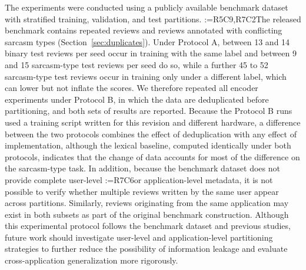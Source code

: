 \documentclass[a4paper,fleqn]{cas-sc}
\makeatletter
\newif\iftracked
\newcommand{\rv@setcolour}[1]{%
  \IfStrEq{#1}{R7C7}{\color{rvEdit}}{%
    \IfSubStr{#1}{R5}{\IfSubStr{#1}{R7}{\color{rvBoth}}{\color{rvFive}}}{\color{rvSeven}}}}
\newcommand{\rv@tag}[1]{\textsuperscript{\sffamily\bfseries\scriptsize[\StrSubstitute{#1}{,}{, }]}\,}
\newcommand{\rv@recordone}[1]{%
  \edef\rv@i{#1}%
  \ifcsdef{rv@n@\rv@i}{}{\csgdef{rv@n@\rv@i}{0}}%
  \csxdef{rv@n@\rv@i}{\the\numexpr\csuse{rv@n@\rv@i}+1\relax}%
  \begingroup\edef\@currentlabel{\rv@i}\label{rv:\rv@i:\csuse{rv@n@\rv@i}}\endgroup}
\newcommand{\rv@record}[1]{\@for\rv@id:=#1\do{\expandafter\rv@recordone\expandafter{\rv@id}}}
\DeclareRobustCommand{\rc}[2]{\rv@record{#1}\iftracked{\rv@setcolour{#1}\rv@tag{#1}#2}\else#2\fi}
\DeclareRobustCommand{\rcrep}[3]{\rv@record{#1}\iftracked{\rv@setcolour{#1}\rv@tag{#1}\rv@strike{#2} #3}\else#3\fi}
\makeatother
\begin{document}
The experiments were conducted using a publicly available benchmark dataset with stratified training, validation, and test partitions. \rcrep{R5C9,R7C2}{A duplicate-text audit of the partitions identified a small number of reviews whose exact text appears in more than one partition, amounting to between five and eleven training and test pairs per seed for the binary task and between forty-eight and fifty-four per seed for the sarcasm-type task. These overlaps originate in the benchmark corpus itself, which contains 82 duplicated rows in the binary dataset and 487 duplicated rows in the sarcasm-type dataset. For the sarcasm-type task, the affected instances correspond to approximately two percent of a training partition of 2,422 reviews, and the resulting optimistic bias is therefore expected to be small but is not zero. We report these counts explicitly rather than omitting them, and deduplication prior to partitioning is identified as a necessary refinement of the protocol.}{The released benchmark contains repeated reviews and reviews annotated with conflicting sarcasm types (Section~\ref{sec:duplicates}). Under Protocol A, between 13 and 14 binary test reviews per seed occur in training with the same label and between 9 and 15 sarcasm-type test reviews per seed do so, while a further 45 to 52 sarcasm-type test reviews occur in training only under a different label, which can lower but not inflate the scores. We therefore repeated all encoder experiments under Protocol B, in which the data are deduplicated before partitioning, and both sets of results are reported. Because the Protocol B runs used a training script written for this revision and different hardware, a difference between the two protocols combines the effect of deduplication with any effect of implementation, although the lexical baseline, computed identically under both protocols, indicates that the change of data accounts for most of the difference on the sarcasm-type task.} In addition, because the benchmark dataset does not provide complete user-level \rc{R7C6}{or application-level} metadata, it is not possible to verify whether multiple reviews written by the same user appear across partitions. Similarly, reviews originating from the same application may exist in both subsets as part of the original benchmark construction. Although this experimental protocol follows the benchmark dataset and previous studies, future work should investigate user-level and application-level partitioning strategies to further reduce the possibility of information leakage and evaluate cross-application generalization more rigorously.
\end{document}
